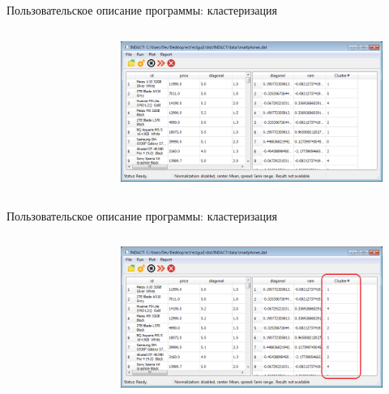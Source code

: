 \documentclass[aspectratio=169,tikz]{beamer}
\begin{document}
	\begin{frame}{Пользовательское описание программы: кластеризация}
		\begin{columns}
			\begin{figure}[T] %
				\centering
				
			\end{figure}
			\begin{figure}[T] %
				\centering
				\includegraphics[width=0.95\linewidth]{img/diploma/instruction/clustering-compl1-prez}
			\end{figure}
		\end{columns}
	\end{frame}	
	
	
	\begin{frame}{Пользовательское описание программы: кластеризация}
	\begin{columns}
		\column{0.2\linewidth}
		\begin{figure}[T] %
			\centering
			
		\end{figure}
		\column{0.8\linewidth}
		\begin{figure}[T] %
			\centering
			\includegraphics[width=0.95\linewidth]{img/diploma/instruction/clustering-compl2-prez}
		\end{figure}
	\end{columns}
	\end{frame}	
\end{document}
